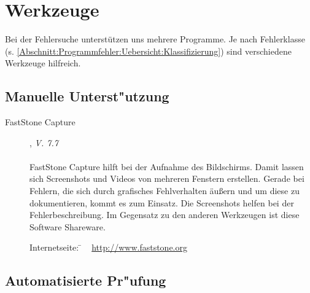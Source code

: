 %



\section{Werkzeuge}
\label{Abschnitt:Programmfehler:Werkzeuge}

Bei der Fehlersuche unterstützen uns mehrere Programme.
Je nach Fehlerklasse (s. \ref{Abschnitt:Programmfehler:Uebersicht:Klassifizierung}) sind verschiedene Werkzeuge hilfreich.





\subsection{Manuelle Unterst{"u}tzung}
\label{Abschnitt:Programmfehler:Werkzeuge:Manuell}


\begin{description}

	\item[FastStone Capture], \textit{V. 7.7}\hfill
		\\
		\\
		FastStone Capture hilft bei der Aufnahme des Bildschirms. Damit lassen sich Screenshots und Videos von mehreren Fenstern erstellen. Gerade bei Fehlern, die sich durch grafisches Fehlverhalten äußern und um diese zu dokumentieren, kommt es zum Einsatz. Die Screenshots helfen bei der Fehlerbeschreibung. Im Gegensatz zu den anderen Werkzeugen ist diese Software Shareware.
		
		\begin{tabbing}
			Internetseite:
			\= ~ \href {http://www.faststone.org}
		    	       {http://www.faststone.org}
		    \\
		\end{tabbing}

\end{description}




\subsection{Automatisierte Pr{"u}fung}
\label{Abschnitt:Programmfehler:Werkzeuge:Automatisiert}







